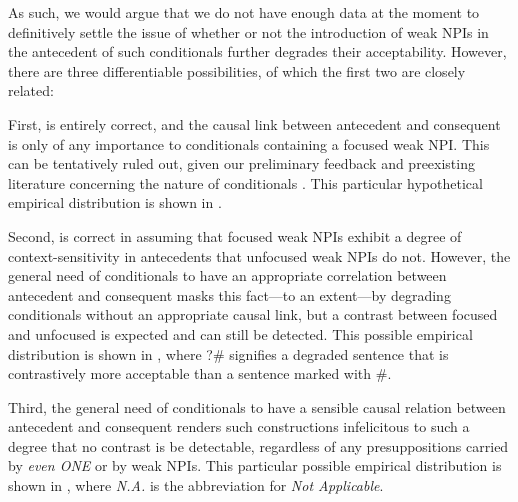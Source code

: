 As such, we would argue that we do not have enough data at the moment to definitively settle the issue of whether or not the introduction of weak NPIs in the antecedent of such conditionals further degrades their acceptability. However, there are three differentiable possibilities, of which the first two are closely related: 

First, \textcite{Crnic2014-dogma} is entirely correct, and the causal link between antecedent and consequent is only of any importance to conditionals containing a focused weak NPI. This can be tentatively ruled out, given our preliminary feedback and preexisting literature concerning the nature of conditionals \parencite{Douven2008,Schulz2011,Spohn2013,vanRooij2022}. This particular hypothetical empirical distribution is shown in .
\begin{table}[!htb]
\end{table}

Second, \textcite{Crnic2014-dogma} is correct in assuming that focused weak NPIs exhibit a degree of context-sensitivity in antecedents that unfocused weak NPIs do not. However, the general need of conditionals to have an appropriate correlation between antecedent and consequent masks this fact---to an extent---by degrading conditionals without an appropriate causal link, but a contrast between focused and unfocused is expected and can still be detected. This possible empirical distribution is shown in , where ?\# signifies a degraded sentence that is contrastively more acceptable than a sentence marked with \#.
\begin{table}[!htb]
\end{table}

Third, the general need of conditionals to have a sensible causal relation between antecedent and consequent renders such constructions infelicitous to such a degree that no contrast is be detectable, regardless of any presuppositions carried by \textit{even \MakeUppercase{one}} or by weak NPIs. This particular possible empirical distribution is shown in , where \textit{N.A.} is the abbreviation for \textit{Not Applicable}.
\begin{table}[!htb]
\end{table}

